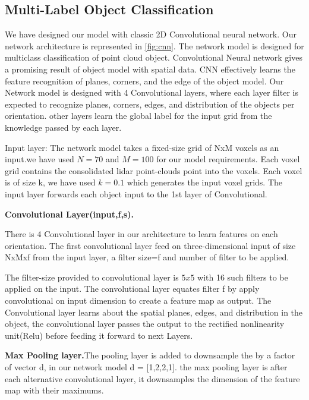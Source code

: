 \subsection{Multi-Label Object Classification} 

We have designed our model with classic 2D Convolutional neural network.
Our network architecture is represented in \ref{fig:cnn}.
The network model is designed for multiclass classification of point cloud object.
Convolutional Neural network gives a promising result of object model with spatial data. 
CNN effectively learns the feature recognition of planes, corners, and the edge of the object model.
Our Network model is designed with 4 Convolutional layers, where each layer filter is expected to recognize
planes, corners, edges, and distribution of the objects per orientation.
other layers learn the global label for the input grid from the knowledge passed by each layer.

Input layer:
The network model takes a fixed-size grid of NxM voxels as an input.we have used $N=70$ and $M=100$ for our model requirements.
Each voxel grid contains the consolidated lidar point-clouds point into the voxels. Each voxel is of size k, we have used $k=0.1$
which generates the input voxel grids. The input layer forwards each object input to the 1st layer of Convolutional.


\textbf{Convolutional Layer(input,f,s).}

There is 4 Convolutional layer in our architecture to learn features on each orientation.
The first convolutional layer feed on three-dimensional input of size NxMxf from the input layer, a filter size=f and number of filter to be applied.

The filter-size provided to convolutional layer is $5x5$ with 16 such filters to be applied on the input.
The convolutional layer equates filter f by apply convolutional on input dimension to create a feature map as output.
The Convolutional layer learns about the spatial planes, edges, and distribution in the object, 
the convolutional layer passes the output to the rectified nonlinearity unit(Relu) before feeding it forward to next Layers.

\textbf{Max Pooling layer.}The pooling layer is added to downsample the by a factor of vector d, in our network model d = [1,2,2,1].
the max pooling layer is after each alternative convolutional layer, it downsamples the dimension of the feature map with their maximums.

